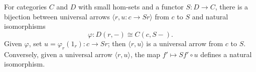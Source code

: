 For categories $C$ and $D$ with small hom-sets and a functor $S: D \to C$, there is a bijection between universal arrows $\langle r, u: c \to Sr \rangle$ from $c$ to $S$ and natural isomorphisms
$$\varphi: D(r, -) \cong C(c, S-).$$
Given $\varphi$, set $u = \varphi_r(1_r): c \to Sr$; then $\langle r, u \rangle$ is a universal arrow from $c$ to $S$. Conversely, given a universal arrow $\langle r, u \rangle$, the map $f' \mapsto Sf' \circ u$ defines a natural isomorphism.